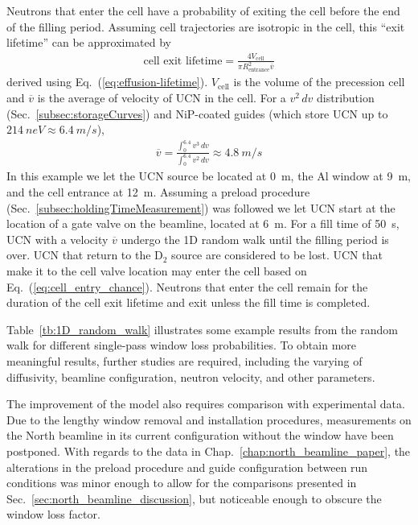 Neutrons that enter the cell have a probability of exiting the cell before the end of the filling period. Assuming cell trajectories are isotropic in the cell, this ``exit lifetime'' can be approximated by
%
\begin{gather}
    \text{cell exit lifetime} = \frac{4V_\text{cell}}{\pi R_\text{entrance}^2 \overline{v}}
\end{gather}
%
derived using Eq.~(\ref{eq:effusion-lifetime}). $V_\text{cell}$ is the volume of the precession cell and $\overline{v}$ is the average of velocity of UCN in the cell. For a $v^2\,dv$ distribution (Sec.~\ref{subsec:storageCurves}) and NiP-coated guides (which store UCN up to $\qty{214}{neV}\approx\qty{6.4}{m\per s}$), 
%
\begin{gather}
    \overline{v}=\frac{\int_0^{6.4}{v^3\,dv}}{\int_0^{6.4}{v^2\,dv}}\approx \qty{4.8}{m\per s}
\end{gather}
%
In this example we let the UCN source be located at \qty{0}{m}, the Al window at \qty{9}{m}, and the cell entrance at \qty{12}{m}. Assuming a preload procedure (Sec.~\ref{subsec:holdingTimeMeasurement}) was followed we let UCN start at the location of a gate valve on the beamline, located at \qty{6}{m}. For a fill time of \qty{50}{s}, UCN with a velocity $\overline{v}$ undergo the 1D random walk until the filling period is over. UCN that return to the D$_2$ source are considered to be lost. UCN that make it to the cell valve location may enter the cell based on Eq.~(\ref{eq:cell_entry_chance}). Neutrons that enter the cell remain for the duration of the cell exit lifetime and exit unless the fill time is completed.

Table~\ref{tb:1D_random_walk} illustrates some example results from the random walk for different single-pass window loss probabilities. To obtain more meaningful results, further studies are required, including the varying of diffusivity, beamline configuration, neutron velocity, and other parameters. 

The improvement of the model also requires comparison with experimental data. Due to the lengthy window removal and installation procedures, measurements on the North beamline in its current configuration without the window have been postponed. With regards to the data in Chap.~\ref{chap:north_beamline_paper}, the alterations in the preload procedure and guide configuration between run conditions was minor enough to allow for the comparisons presented in Sec.~\ref{sec:north_beamline_discussion}, but noticeable enough to obscure the window loss factor.

